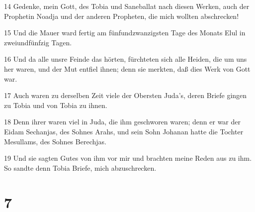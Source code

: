 \par 14 Gedenke, mein Gott, des Tobia und Saneballat nach diesen Werken, auch der Prophetin Noadja und der anderen Propheten, die mich wollten abschrecken!
\par 15 Und die Mauer ward fertig am fünfundzwanzigsten Tage des Monats Elul in zweiundfünfzig Tagen.
\par 16 Und da alle unsre Feinde das hörten, fürchteten sich alle Heiden, die um uns her waren, und der Mut entfiel ihnen; denn sie merkten, daß dies Werk von Gott war.
\par 17 Auch waren zu derselben Zeit viele der Obersten Juda's, deren Briefe gingen zu Tobia und von Tobia zu ihnen.
\par 18 Denn ihrer waren viel in Juda, die ihm geschworen waren; denn er war der Eidam Sechanjas, des Sohnes Arahs, und sein Sohn Johanan hatte die Tochter Mesullams, des Sohnes Berechjas.
\par 19 Und sie sagten Gutes von ihm vor mir und brachten meine Reden aus zu ihm. So sandte denn Tobia Briefe, mich abzuschrecken.

\chapter{7}


